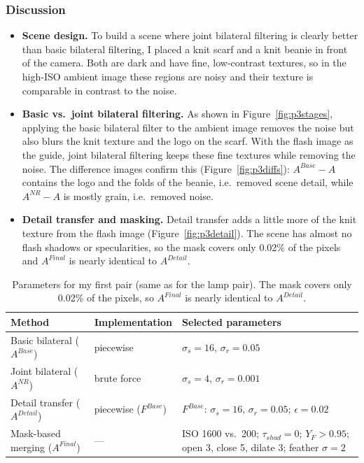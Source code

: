 \documentclass[11pt]{article}
\begin{document}
\subsubsection*{Discussion}
\begin{itemize}\setlength{\itemsep}{0pt}
\item \textbf{Scene design.} To build a scene where joint bilateral filtering is clearly better than basic bilateral filtering, I placed a knit scarf and a knit beanie in front of the camera. Both are dark and have fine, low-contrast textures, so in the high-ISO ambient image these regions are noisy and their texture is comparable in contrast to the noise.

\item \textbf{Basic vs.\ joint bilateral filtering.} As shown in Figure~\ref{fig:p3stages}, applying the basic bilateral filter to the ambient image removes the noise but also blurs the knit texture and the logo on the scarf. With the flash image as the guide, joint bilateral filtering keeps these fine textures while removing the noise. The difference images confirm this (Figure~\ref{fig:p3diffs}): $A^{Base}-A$ contains the logo and the folds of the beanie, i.e.\ removed scene detail, while $A^{NR}-A$ is mostly grain, i.e.\ removed noise.

\item \textbf{Detail transfer and masking.} Detail transfer adds a little more of the knit texture from the flash image (Figure~\ref{fig:p3detail}). The scene has almost no flash shadows or specularities, so the mask covers only 0.02\% of the pixels and $A^{Final}$ is nearly identical to $A^{Detail}$.
\end{itemize}

\begin{table}[!htbp]
\centering
\small
\begin{tabular}{lll}
\toprule
Method & Implementation & Selected parameters \\
\midrule
Basic bilateral ($A^{Base}$) & piecewise & $\sigma_s=16$, $\sigma_r=0.05$ \\
Joint bilateral ($A^{NR}$) & brute force & $\sigma_s=4$, $\sigma_r=0.001$ \\
Detail transfer ($A^{Detail}$) & piecewise ($F^{Base}$) & $F^{Base}$: $\sigma_s=16$, $\sigma_r=0.05$; $\epsilon=0.02$ \\
Mask-based merging ($A^{Final}$) & --- & ISO 1600 vs.\ 200; $\tau_{shad}=0$; $Y_F>0.95$; open 3, close 5, dilate 3; feather $\sigma=2$ \\
\bottomrule
\end{tabular}
\caption{Parameters for my first pair (same as for the lamp pair). The mask covers only 0.02\% of the pixels, so $A^{Final}$ is nearly identical to $A^{Detail}$.}
\label{tab:p3params}
\end{table}
\end{document}
